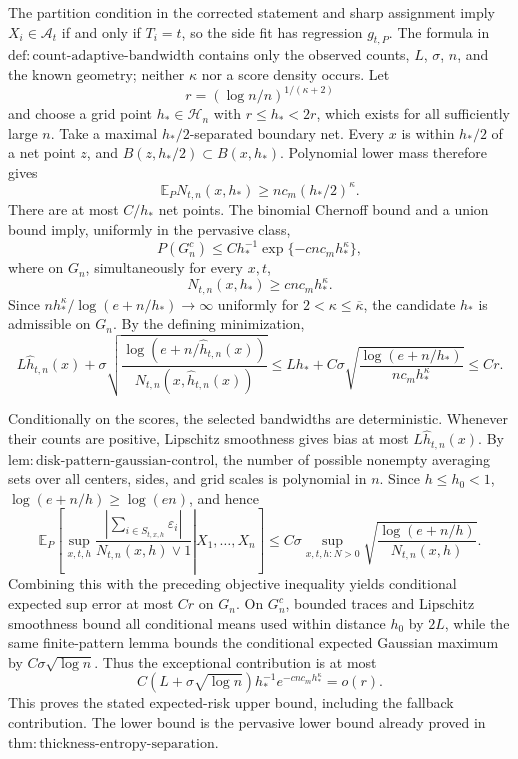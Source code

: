 The partition condition in the corrected statement and sharp assignment imply \(X_i\in\mathcal A_t\) if and only if \(T_i=t\), so the side fit has regression \(g_{t,P}\). The formula in \(\mathrm{def:count\text{-}adaptive\text{-}bandwidth}\) contains only the observed counts, \(L\), \(\sigma\), \(n\), and the known geometry; neither \(\kappa\) nor a score density occurs. Let
\[
 r=(\log n/n)^{1/(\kappa+2)}
\]
and choose a grid point \(h_*\in\mathcal H_n\) with \(r\le h_*<2r\), which exists for all sufficiently large \(n\). Take a maximal \(h_*/2\)-separated boundary net. Every \(x\) is within \(h_*/2\) of a net point \(z\), and \(B(z,h_*/2)\subset B(x,h_*)\). Polynomial lower mass therefore gives
\[
 \mathbb E_PN_{t,n}(x,h_*)\ge nc_m(h_*/2)^\kappa.
\]
There are at most \(C/h_*\) net points. The binomial Chernoff bound and a union bound imply, uniformly in the pervasive class,
\[
 P(G_n^c)\le Ch_*^{-1}\exp\{-c n c_mh_*^\kappa\},
\]
where on \(G_n\), simultaneously for every \(x,t\),
\[
 N_{t,n}(x,h_*)\ge c n c_mh_*^\kappa.
\]
Since \(nh_*^\kappa/\log(e+n/h_*)\to\infty\) uniformly for \(2<\kappa\le\overline\kappa\), the candidate \(h_*\) is admissible on \(G_n\). By the defining minimization,
\[
 L\widehat h_{t,n}(x)+\sigma
 \sqrt{\frac{\log(e+n/\widehat h_{t,n}(x))}
 {N_{t,n}(x,\widehat h_{t,n}(x))}}
 \le Lh_*+C\sigma\sqrt{\frac{\log(e+n/h_*)}{n c_mh_*^\kappa}}
 \le Cr.
\]

Conditionally on the scores, the selected bandwidths are deterministic. Whenever their counts are positive, Lipschitz smoothness gives bias at most \(L\widehat h_{t,n}(x)\). By \(\mathrm{lem:disk\text{-}pattern\text{-}gaussian\text{-}control}\), the number of possible nonempty averaging sets over all centers, sides, and grid scales is polynomial in \(n\). Since \(h\le h_0<1\), \(\log(e+n/h)\ge\log(en)\), and hence
\[
 \mathbb E_P\left[\left.
 \sup_{x,t,h}\frac{|\sum_{i\in S_{t,x,h}}\varepsilon_i|}
 {N_{t,n}(x,h)\vee1}\right|X_1,\ldots,X_n\right]
 \le C\sigma\sup_{x,t,h:N>0}
 \sqrt{\frac{\log(e+n/h)}{N_{t,n}(x,h)}}.
\]
Combining this with the preceding objective inequality yields conditional expected sup error at most \(Cr\) on \(G_n\). On \(G_n^c\), bounded traces and Lipschitz smoothness bound all conditional means used within distance \(h_0\) by \(2L\), while the same finite-pattern lemma bounds the conditional expected Gaussian maximum by \(C\sigma\sqrt{\log n}\). Thus the exceptional contribution is at most
\[
 C(L+\sigma\sqrt{\log n})h_*^{-1}e^{-c n c_mh_*^\kappa}=o(r).
\]
This proves the stated expected-risk upper bound, including the fallback contribution. The lower bound is the pervasive lower bound already proved in \(\mathrm{thm:thickness\text{-}entropy\text{-}separation}\).

